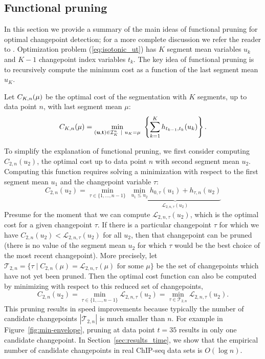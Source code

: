 \documentclass[twoside,11pt]{article}
\begin{document}
\subsection{Functional pruning}
\label{sec:functional-pruning}

In this section we provide a summary of the main ideas of functional
pruning for optimal changepoint detection; for a more complete
discussion we refer the reader to \citep{fpop}. Optimization problem
(\ref{eq:isotonic_ut}) has $K$ segment mean variables $u_k$ and $K-1$
changepoint index variables $t_k$. The key idea of functional pruning
is to recursively compute the minimum cost as a function of the last
segment mean $u_K$.

\begin{definition}
\label{def:fcc}
  Let $C_{K,n}(\mu)$ be the optimal cost of the segmentation
  with $K$ segments, up to data point $n$, with last segment mean
  $\mu$:
\begin{equation}
C_{K,n}(\mu) = \min_{(\mathbf u, \mathbf t)\in{\mathcal I}^n_K \ | \ u_K = \mu} \
  \left\{ \sum_{k=1}^K
  h_{t_{k-1}, t_k}(u_k) \right\}.
\end{equation}
\end{definition}

To simplify the explanation of functional pruning, we first consider
computing $C_{2,n}(u_2)$, the optimal cost up to data point $n$ with
second segment mean $u_2$. Computing this function requires solving a
minimization with respect to the first segment mean $u_1$ and the
changepoint variable $\tau$:
\begin{equation}
  C_{2,n}(u_2) = 
\min_{\tau\in\{1,\dots,n-1\}}
\ 
\underbrace{\min_{u_1\leq u_2}
  h_{0,\tau}(u_1) +
h_{\tau, n}(u_2)}_{\mathcal L_{2,n,\tau}(u_2)}
\end{equation}
Presume for the moment that we can compute
$\mathcal L_{2,n,\tau}(u_2)$, which is the optimal cost for a given
changepoint $\tau$. If there is a particular changepoint $\tau$ for
which we have $C_{2,n}(u_2)<\mathcal L_{2,n,\tau}(u_2)$ for all $u_2$,
then that changepoint can be pruned (there is no value of the segment
mean $u_2$ for which $\tau$ would be the best choice of the most
recent changepoint). More precisely, let
$\mathcal T_{2,n}=\{ \tau\mid C_{2,n}(\mu)=\mathcal L_{2,n,\tau}(\mu)
\text{ for some $\mu$} \}$ be the set of changepoints which have not
yet been pruned.  Then the optimal cost function can also be computed
by minimizing with respect to this reduced set of changepoints,
\begin{equation}
  C_{2,n}(u_2) = 
\min_{\tau\in\{1,\dots,n-1\}}
\mathcal L_{2,n,\tau}(u_2)
=
\min_{\tau\in\mathcal T_{2,n}}
\mathcal L_{2,n,\tau}(u_2).
\end{equation}
This pruning results in speed improvements because typically the
number of candidate changepoints $|\mathcal T_{2,n}|$ is much smaller
than $n$. For example in Figure~\ref{fig:min-envelope}, pruning at
data point $t=35$ results in only one candidate changepoint. In
Section~\ref{sec:results_time}, we show that the empirical number of
candidate changepoints in real ChIP-seq data sets is $O(\log n)$.
\end{document}

